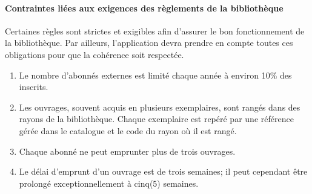 \paragraph{Contraintes liées aux exigences des règlements de la bibliothèque}
Certaines règles sont strictes et exigibles afin d’assurer le bon fonctionnement 
de la bibliothèque. Par ailleurs, l’application devra prendre en compte toutes
 ces obligations pour que la cohérence soit respectée. \par
 \begin{enumerate}
     \item Le nombre d’abonnés externes est limité chaque année à environ 
     10\% des inscrits.
     \item Les ouvrages, souvent acquis en plusieurs exemplaires, sont 
     rangés dans des rayons de la bibliothèque. Chaque exemplaire est repéré 
     par une référence gérée dans le catalogue et le code du rayon où il est rangé.
     \item Chaque abonné ne peut emprunter plus de trois ouvrages.
     \item Le délai d’emprunt d’un ouvrage est de trois semaines; il peut 
     cependant être prolongé exceptionnellement à cinq(5) semaines.
 \end{enumerate}